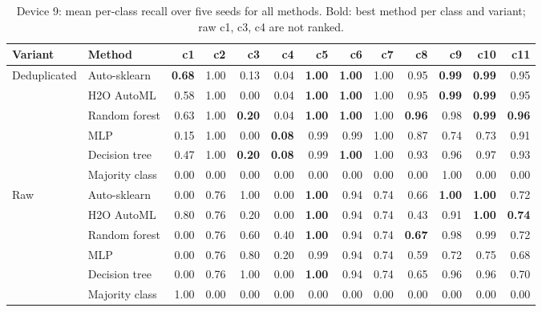 \begin{table}[t]
\centering
\caption{Device 9: mean per-class recall over five seeds for all methods. Bold: best method per class and variant; raw c1, c3, c4 are not ranked.}
\label{tab:perclass9all}
\scriptsize
\setlength{\tabcolsep}{3pt}
\begin{tabular}{@{}llrrrrrrrrrrr@{}}
\toprule
Variant & Method & c1 & c2 & c3 & c4 & c5 & c6 & c7 & c8 & c9 & c10 & c11 \\
\midrule
Deduplicated & Auto-sklearn & \textbf{0.68} & 1.00 & 0.13 & 0.04 & \textbf{1.00} & \textbf{1.00} & 1.00 & 0.95 & \textbf{0.99} & \textbf{0.99} & 0.95 \\
 & H2O AutoML & 0.58 & 1.00 & 0.00 & 0.04 & \textbf{1.00} & \textbf{1.00} & 1.00 & 0.95 & \textbf{0.99} & \textbf{0.99} & 0.95 \\
 & Random forest & 0.63 & 1.00 & \textbf{0.20} & 0.04 & \textbf{1.00} & \textbf{1.00} & 1.00 & \textbf{0.96} & 0.98 & \textbf{0.99} & \textbf{0.96} \\
 & MLP & 0.15 & 1.00 & 0.00 & \textbf{0.08} & 0.99 & 0.99 & 1.00 & 0.87 & 0.74 & 0.73 & 0.91 \\
 & Decision tree & 0.47 & 1.00 & \textbf{0.20} & \textbf{0.08} & 0.99 & \textbf{1.00} & 1.00 & 0.93 & 0.96 & 0.97 & 0.93 \\
 & Majority class & 0.00 & 0.00 & 0.00 & 0.00 & 0.00 & 0.00 & 0.00 & 0.00 & 1.00 & 0.00 & 0.00 \\
\midrule
Raw & Auto-sklearn & 0.00 & 0.76 & 1.00 & 0.00 & \textbf{1.00} & 0.94 & 0.74 & 0.66 & \textbf{1.00} & \textbf{1.00} & 0.72 \\
 & H2O AutoML & 0.80 & 0.76 & 0.20 & 0.00 & \textbf{1.00} & 0.94 & 0.74 & 0.43 & 0.91 & \textbf{1.00} & \textbf{0.74} \\
 & Random forest & 0.00 & 0.76 & 0.60 & 0.40 & \textbf{1.00} & 0.94 & 0.74 & \textbf{0.67} & 0.98 & 0.99 & 0.72 \\
 & MLP & 0.00 & 0.76 & 0.80 & 0.20 & 0.99 & 0.94 & 0.74 & 0.59 & 0.72 & 0.75 & 0.68 \\
 & Decision tree & 0.00 & 0.76 & 1.00 & 0.00 & \textbf{1.00} & 0.94 & 0.74 & 0.65 & 0.96 & 0.96 & 0.70 \\
 & Majority class & 1.00 & 0.00 & 0.00 & 0.00 & 0.00 & 0.00 & 0.00 & 0.00 & 0.00 & 0.00 & 0.00 \\
\bottomrule
\end{tabular}
\end{table}
